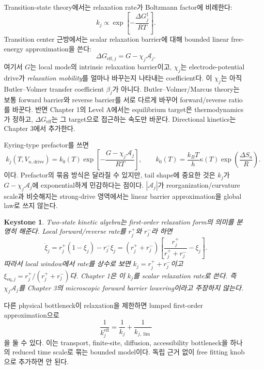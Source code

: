 \documentclass[11pt,a4paper]{article}
\newtheorem*{keybox}{Keystone}
\newcommand{\eff}{\mathrm{eff}}
\newcommand{\eq}{\mathrm{eq}}
\newcommand{\drive}{\mathrm{drive}}
\begin{document}
Transition-state theory에서는 relaxation rate가 Boltzmann factor에 비례한다:
\begin{equation}
k_j\propto \exp\left[-\frac{\Delta G_j^\ddagger}{RT}\right].
\end{equation}
Transition center 근방에서는 scalar relaxation barrier에 대해 bounded linear free-energy approximation을 쓴다:
\begin{equation}
\boxed{\;\Delta G_{\eff,j}=G-\chi_j\mathcal A_j.\;}
\label{eq:Geff}
\end{equation}
여기서 $G$는 local mode의 intrinsic relaxation barrier이고, $\chi_j$는 electrode-potential drive가 \emph{relaxation mobility}를
얼마나 바꾸는지 나타내는 coefficient다. 이 $\chi_j$는 아직 Butler--Volmer transfer coefficient $\beta_j$가 아니다.
Butler--Volmer/Marcus theory는 보통 forward barrier와 reverse barrier를 서로 다르게 바꾸어 forward/reverse ratio를 바꾼다.
반면 Chapter 1의 Level A에서는 equilibrium target은 thermodynamics가 정하고, $\Delta G_{\eff}$는 그 target으로 접근하는 속도만
바꾼다. Directional kinetics는 Chapter 3에서 추가한다.

Eyring-type prefactor를 쓰면
\begin{equation}
\boxed{\;k_j(T,V_{n,\drive})=k_0(T)
\exp\left[-\frac{G-\chi_j\mathcal A_j}{RT}\right],\qquad
k_0(T)=\frac{k_BT}{h}\kappa(T)\exp\left(\frac{\Delta S_a}{R}\right).\;}
\label{eq:kact}
\end{equation}
이다. Prefactor의 묶음 방식은 달라질 수 있지만, tail shape에 중요한 것은 $k_j$가 $G-\chi_j\mathcal A_j$에 exponential하게
민감하다는 점이다. $|\mathcal A_j|$가 reorganization/curvature scale과 비슷해지는 strong-drive 영역에서는 linear barrier
approximation을 global law로 쓰지 않는다.

\begin{keybox}
Two-state kinetic algebra는 first-order relaxation form의 의미를 분명히 해준다. Local forward/reverse rate를 $r_j^+$와
$r_j^-$라 하면
\begin{equation}
\dot\xi_j=r_j^+(1-\xi_j)-r_j^-\xi_j=(r_j^++r_j^-)
\left[\frac{r_j^+}{r_j^++r_j^-}-\xi_j\right].
\end{equation}
따라서 local window에서 rate를 상수로 보면 $k_j=r_j^++r_j^-$이고
$\xi_{\eq,j}=r_j^+/(r_j^++r_j^-)$다. Chapter 1은 이 $k_j$를 scalar relaxation rate로 쓴다. 즉
$\chi_j\mathcal A_j$를 Chapter 3의 microscopic forward barrier lowering이라고 주장하지 않는다.
\end{keybox}

다른 physical bottleneck이 relaxation을 제한하면 lumped first-order approximation으로
\begin{equation}
\frac{1}{k_j^{\eff}}=\frac{1}{k_j}+\frac{1}{k_{j,\lim}}
\label{eq:kphys}
\end{equation}
을 둘 수 있다. 이는 transport, finite-site, diffusion, accessibility bottleneck을 하나의 reduced time scale로 묶는 bounded model이다.
독립 근거 없이 free fitting knob으로 추가하면 안 된다.
\end{document}
